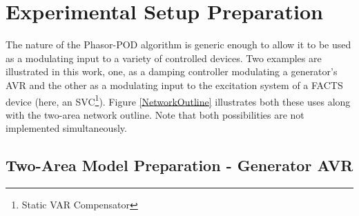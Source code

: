 \documentclass[journal]{IEEEtran}
\begin{document}
%



\section{Experimental Setup Preparation}\label{SetupPreparation}

The nature of the Phasor-POD algorithm is generic enough to allow it to be used as a modulating input to a variety of controlled devices. Two examples are illustrated in this work, one, as a damping controller modulating a generator\rq{s} AVR and the other as a modulating input to the excitation system of a FACTS device (here, an SVC\footnote{Static VAR Compensator}). Figure \ref{NetworkOutline} illustrates both these uses along with the two-area network outline. Note that both possibilities are not implemented simultaneously.

\subsection{Two-Area Model Preparation - Generator AVR}
\end{document}
